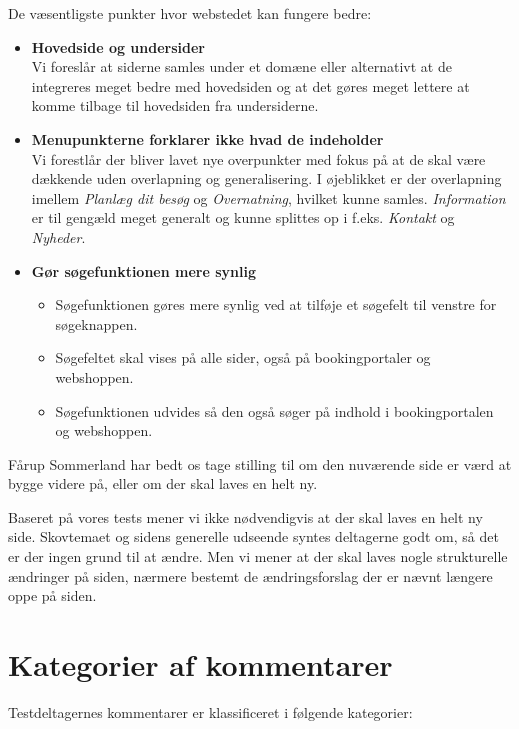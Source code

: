 \documentclass[10pt,a4paper]{article}      %
\begin{document}
\noindent De væsentligste punkter hvor webstedet kan fungere bedre:
\begin{itemize}
    \item \textbf{Hovedside og undersider}\\
        Vi foreslår at siderne samles under et
        domæne eller alternativt at de integreres meget bedre med hovedsiden og at det gøres
        meget lettere at komme tilbage til hovedsiden fra undersiderne.

    \item \textbf{Menupunkterne forklarer ikke hvad de indeholder}\\
        Vi forestlår der bliver lavet nye overpunkter med fokus på at de skal være dækkende
        uden overlapning og generalisering. I øjeblikket er der overlapning imellem
        \emph{Planlæg dit besøg} og \emph{Overnatning}, hvilket kunne samles.
        \emph{Information} er til gengæld meget generalt og kunne splittes op i f.eks.
        \emph{Kontakt} og \emph{Nyheder}.

    \item \textbf{Gør søgefunktionen mere synlig}
        \begin{itemize}
            \item Søgefunktionen gøres mere synlig ved at tilføje et søgefelt til venstre for søgeknappen.
            \item Søgefeltet skal vises på alle sider, også på bookingportaler og webshoppen.
            \item Søgefunktionen udvides så den også søger på indhold i bookingportalen og webshoppen.
        \end{itemize}

\end{itemize}

\noindent Fårup Sommerland har bedt os tage stilling til om den nuværende side er værd at bygge videre på, eller om der skal laves en helt ny.

Baseret på vores tests mener vi ikke nødvendigvis at der skal laves en helt ny side. Skovtemaet og sidens generelle udseende syntes deltagerne godt om, så det er der ingen grund til at ændre. Men vi mener at der skal laves nogle strukturelle ændringer på siden, nærmere bestemt de ændringsforslag der er nævnt længere oppe på siden.

\clearpage

\tableofcontents
\clearpage


\section{Kategorier af kommentarer}
Testdeltagernes kommentarer er klassificeret i følgende kategorier:
\end{document}

